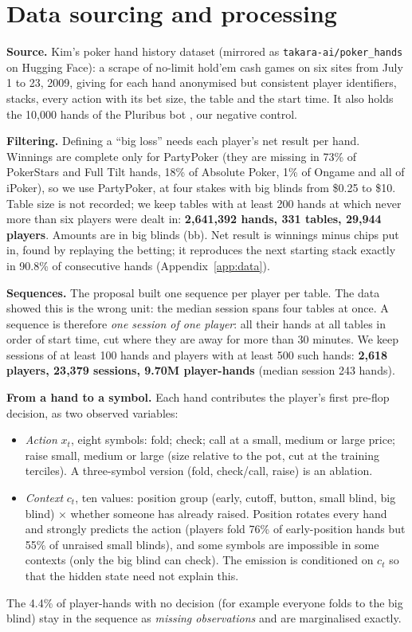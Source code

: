 \documentclass{article}
\begin{document}
\section{Data sourcing and processing}
\textbf{Source.} Kim's poker hand history dataset \cite{kim2024,kim2025} (mirrored as \texttt{takara-ai/poker\_hands} on Hugging Face): a scrape of no-limit hold'em cash games on six sites from July 1 to 23, 2009, giving for each hand anonymised but consistent player identifiers, stacks, every action with its bet size, the table and the start time. It also holds the 10{,}000 hands of the Pluribus bot \cite{brown2019}, our negative control.

\textbf{Filtering.} Defining a ``big loss'' needs each player's net result per hand. Winnings are complete only for PartyPoker (they are missing in 73\% of PokerStars and Full Tilt hands, 18\% of Absolute Poker, 1\% of Ongame and all of iPoker), so we use PartyPoker, at four stakes with big blinds from \$0.25 to \$10. Table size is not recorded; we keep tables with at least 200 hands at which never more than six players were dealt in: \textbf{2{,}641{,}392 hands, 331 tables, 29{,}944 players}. Amounts are in big blinds (bb). Net result is winnings minus chips put in, found by replaying the betting; it reproduces the next starting stack exactly in 90.8\% of consecutive hands (Appendix~\ref{app:data}).

\textbf{Sequences.} The proposal built one sequence per player per table. The data showed this is the wrong unit: the median session spans four tables at once. A sequence is therefore \emph{one session of one player}: all their hands at all tables in order of start time, cut where they are away for more than 30 minutes. We keep sessions of at least 100 hands and players with at least 500 such hands: \textbf{2{,}618 players, 23{,}379 sessions, 9.70M player-hands} (median session 243 hands).

\textbf{From a hand to a symbol.} Each hand contributes the player's first pre-flop decision, as two observed variables:
\begin{itemize}
\item \emph{Action} $x_t$, eight symbols: fold; check; call at a small, medium or large price; raise small, medium or large (size relative to the pot, cut at the training terciles). A three-symbol version (fold, check/call, raise) is an ablation.
\item \emph{Context} $c_t$, ten values: position group (early, cutoff, button, small blind, big blind) $\times$ whether someone has already raised. Position rotates every hand and strongly predicts the action (players fold 76\% of early-position hands but 55\% of unraised small blinds), and some symbols are impossible in some contexts (only the big blind can check). The emission is conditioned on $c_t$ so that the hidden state need not explain this.
\end{itemize}
The 4.4\% of player-hands with no decision (for example everyone folds to the big blind) stay in the sequence as \emph{missing observations} and are marginalised exactly.
\end{document}
